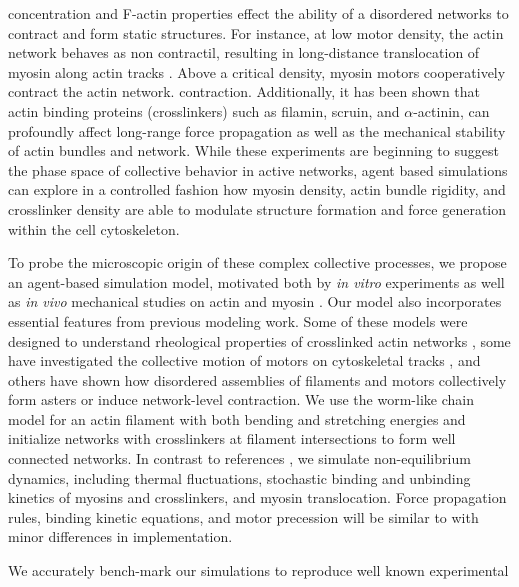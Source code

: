 \documentclass[12pt]{article}
\begin{document}
concentration and F-actin properties effect the ability of a disordered networks
to contract and form static structures\cite{murrell2012, murrell2014, stam2016}.
For instance, at low motor density, the 
actin network behaves as non contractil, resulting in long-distance 
translocation of myosin along actin tracks \cite{burov2013}. Above a
critical density, myosin motors cooperatively contract the actin network.
contraction. Additionally, it has been shown that actin binding proteins 
(crosslinkers) such as filamin, scruin, and $\alpha$-actinin, can profoundly 
affect long-range force propagation as well as the mechanical stability of actin
bundles and network\cite{murrell2012, murrell2014, murrell2015, gardel2004}. 
While these experiments are beginning to suggest the phase space of 
collective behavior in active networks, agent based simulations can explore in a
controlled fashion how myosin density, actin bundle rigidity, and crosslinker
density are able to modulate structure formation and force generation within the
cell cytoskeleton. 
\par
To probe the microscopic origin of these complex collective processes, we 
propose an agent-based simulation model, motivated both by {\em in vitro } 
experiments as well as {\em in vivo} mechanical studies on actin and myosin 
\cite{guha2005,wilson2010}. Our model also incorporates essential features from 
previous modeling work. Some of these models were designed to understand 
rheological properties of crosslinked actin networks \cite{mackintosh1995,head2003,wilhelm2003,kim2009},
some have investigated the collective motion of motors on 
cytoskeletal tracks \cite{nedelec2007,erdmann2012,stam2015}, and others have 
shown how disordered assemblies of filaments and motors collectively form asters
\cite{gordon2012} or induce network-level contraction\cite{wang2012,dasanyake2011,kim2014,ennomani2016}. 
We use the worm-like chain model for an actin filament with both bending and 
stretching energies \cite{nedelec2007} and initialize networks with crosslinkers
at filament intersections to form well connected networks\cite{head2003}. 
In contrast to references \cite{head2003, dasanyake2011}, we simulate 
non-equilibrium dynamics, including thermal fluctuations, stochastic
binding and unbinding kinetics of myosins and crosslinkers, and myosin 
translocation. Force propagation rules, binding kinetic equations, and motor 
precession will be similar to \cite{nedelec2007, gordon2012} with minor 
differences in implementation.
\par
We accurately bench-mark our simulations to reproduce well known experimental 
\end{document}
